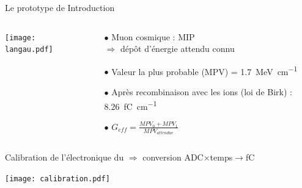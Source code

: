    \begin{frame}{Le prototype de \TOO{}}{Introduction}
    	\begin{scriptsize}
            \begin{columns}
                \begin{column}{0.6\textwidth}
                    \centering \texttt{[image: langau.pdf]}
                \end{column}\hfill
                \begin{column}{0.4\textwidth}
                    \begin{itemize}
       					\item[$\bullet$] Muon cosmique : MIP \\ $\Rightarrow$ dépôt d'énergie attendu connu
       					\item[$\bullet$] Valeur la plus probable (MPV) = \SI{1.7}{\mega\electronvolt\per\centi\meter}
       					\item[$\bullet$] Après recombinaison avec les ions (loi de Birk) : \SI{8.26}{\femto\coulomb\per\centi\meter}
       					\item[$\bullet$] $G_{eff}=\frac{MPV_0 + MPV_1}{MPV_{attendue}}$
       				\end{itemize}
                \end{column}
            \end{columns}
            \vspace{0.2cm}
            Calibration de l'électronique du \TOO{} $\Rightarrow$ conversion ADC$\times$temps$\to$\si{\femto\coulomb}
            \begin{center} \texttt{[image: calibration.pdf]} \end{center}
	    \end{scriptsize}
    \end{frame}

